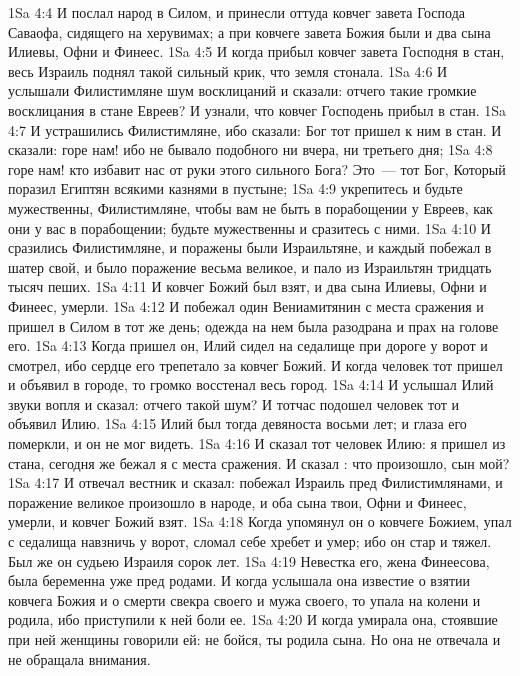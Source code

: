 \vs 1Sa 4:4 И послал народ в Силом, и принесли оттуда ковчег завета Господа Саваофа, сидящего на херувимах; а при ковчеге завета Божия были и два сына Илиевы, Офни и Финеес.
\vs 1Sa 4:5 И когда прибыл ковчег завета Господня в стан, весь Израиль поднял такой сильный крик, что земля стонала.
\vs 1Sa 4:6 И услышали Филистимляне шум восклицаний и сказали: отчего такие громкие восклицания в стане Евреев? И узнали, что ковчег Господень прибыл в стан.
\vs 1Sa 4:7 И устрашились Филистимляне, ибо сказали: Бог тот пришел к ним в стан. И сказали: горе нам! ибо не бывало подобного ни вчера, ни третьего дня;
\vs 1Sa 4:8 горе нам! кто избавит нас от руки этого сильного Бога? Это~--- тот Бог, Который поразил Египтян всякими казнями в пустыне;
\vs 1Sa 4:9 укрепитесь и будьте мужественны, Филистимляне, чтобы вам не быть в порабощении у Евреев, как они у вас в порабощении; будьте мужественны и сразитесь с ними.
\vs 1Sa 4:10 И сразились Филистимляне, и поражены были Израильтяне, и каждый побежал в шатер свой, и было поражение весьма великое, и пало из Израильтян тридцать тысяч пеших.
\vs 1Sa 4:11 И ковчег Божий был взят, и два сына Илиевы, Офни и Финеес, умерли.
\vs 1Sa 4:12 И побежал один Вениамитянин с места сражения и пришел в Силом в тот же день; одежда на нем была разодрана и прах на голове его.
\vs 1Sa 4:13 Когда пришел он, Илий сидел на седалище при дороге у ворот и смотрел, ибо сердце его трепетало за ковчег Божий. И когда человек тот пришел и объявил в городе, то громко восстенал весь город.
\vs 1Sa 4:14 И услышал Илий звуки вопля и сказал: отчего такой шум? И тотчас подошел человек тот и объявил Илию.
\vs 1Sa 4:15 Илий был тогда девяноста восьми лет; и глаза его померкли, и он не мог видеть.
\vs 1Sa 4:16 И сказал тот человек Илию: я пришел из стана, сегодня же бежал я с места сражения. И сказал : что произошло, сын мой?
\vs 1Sa 4:17 И отвечал вестник и сказал: побежал Израиль пред Филистимлянами, и поражение великое произошло в народе, и оба сына твои, Офни и Финеес, умерли, и ковчег Божий взят.
\vs 1Sa 4:18 Когда упомянул он о ковчеге Божием,  упал с седалища навзничь у ворот, сломал себе хребет и умер; ибо он  стар и тяжел. Был же он судьею Израиля сорок лет.
\vs 1Sa 4:19 Невестка его, жена Финеесова, была беременна уже пред родами. И когда услышала она известие о взятии ковчега Божия и о смерти свекра своего и мужа своего, то упала на колени и родила, ибо приступили к ней боли ее.
\vs 1Sa 4:20 И когда умирала она, стоявшие при ней женщины говорили ей: не бойся, ты родила сына. Но она не отвечала и не обращала внимания.
